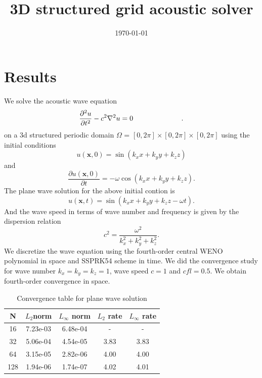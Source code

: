 \documentclass{article}
\title{3D structured grid acoustic solver}
\date{\today}
\author{}
\begin{document}
\maketitle
\section*{Results}
We solve the acoustic wave equation
\begin{equation*}
    \frac{\partial{}^{2}{u}}{\partial{t}^{2}}- c^{2}\nabla{}^{2}{u}=0 \hspace{2.4cm}.
\end{equation*}
on a 3d structured periodic domain $\Omega$ = $[0,2\pi] \times [0,2\pi] \times [0,2\pi]$ using the initial conditions 
\begin{equation*}
	u(\mathbf{x},0)= \sin(k_{x}x + k_{y}y + k_{z}z)
\end{equation*}
and
\begin{equation*}
	\frac{\partial u(\mathbf{x},0)}{\partial t}=-\omega \cos(k_{x}x + k_{y}y + k_{z}z).
\end{equation*}
The plane wave solution for the above initial contion is
\begin{equation}
    u(\mathbf{x},t)= \sin(k_{x}x + k_{y}y + k_{z}z - \omega t).
\end{equation}
And the wave speed in terms of wave number and frequency is given by the dispersion relation
\begin{equation*}
	c^{2}=\frac{\omega^{2}}{k_{x}^{2} + k_{y}^{2} + k_{z}^{2}}.
\end{equation*}
We discretize the wave equation using the fourth-order central WENO polynomial in space and SSPRK54 scheme in time. We did the convergence study for wave number $k_{x} = k_{y} = k_{z} = 1$, wave speed $c = 1$ and $cfl = 0.5$. We obtain fourth-order convergence in space.
\begin{table}[h!]
	\centering
	\begin{tabular}{ |c|c|c|c|c| } 
		\hline
		N   & $L_{2}$norm & $L_{\infty}$ norm & $L_{2}$ rate & $L_{\infty}$ rate \\ 
		\hline
		16  & 7.23e-03 		   & 6.48e-04     & -            & -                \\
		32  & 5.06e-04         & 4.54e-05     & 3.83         & 3.83             \\
		64  & 3.15e-05         & 2.82e-06     & 4.00         & 4.00              \\
		128 & 1.94e-06         & 1.74e-07     & 4.02         & 4.01              \\
		\hline
	\end{tabular}
	\caption{Convergence table for plane wave solution}
	\label{table:2}
\end{table} 
\end{document}
